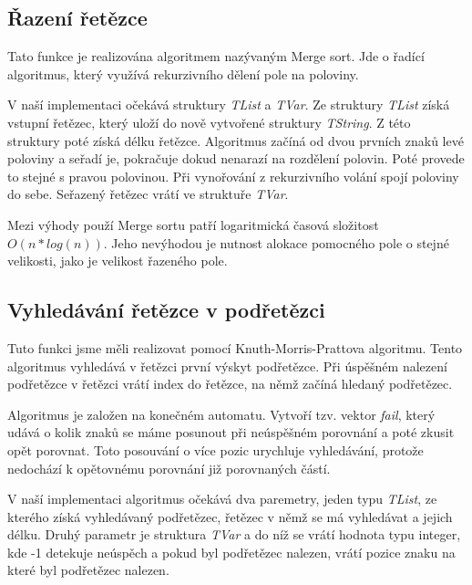 \documentclass[12pt,a4paper,titlepage,final]{article}
\begin{document}
\subsection{Řazení řetězce}

Tato funkce je realizována algoritmem nazývaným Merge sort. Jde o řadící algoritmus, který využívá rekurzivního 
dělení pole na poloviny. 

V naší implementaci očekává struktury \textit{TList} a \textit{TVar}. Ze struktury \textit{TList} získá vstupní řetězec, 
který uloží do nově vytvořené struktury \textit{TString}. Z této struktury poté získá délku řetězce. Algoritmus začíná od dvou 
prvních znaků levé poloviny a seřadí je, pokračuje dokud nenarazí na rozdělení polovin. 
Poté provede to stejné s pravou polovinou. Při vynořování z rekurzivního volání spojí poloviny do sebe.	
Seřazený řetězec vrátí ve struktuře \textit{TVar}.

Mezi výhody použí Merge sortu patří logaritmická časová složitost \begin{math}O(n*log(n))\end{math}. 
Jeho nevýhodou je nutnost alokace pomocného pole o stejné velikosti, jako je velikost řazeného pole. 

\subsection{Vyhledávání řetězce v podřetězci}

Tuto funkci jsme měli realizovat pomocí Knuth-Morris-Prattova algoritmu. Tento algoritmus vyhledává v řetězci 
první výskyt podřetězce. Při úspěšném nalezení podřetězce v řetězci vrátí index do řetězce, na němž začíná hledaný 
podřetězec. 

Algoritmus je založen na konečném automatu. Vytvoří tzv. vektor \textit{fail}, který udává o kolik znaků se máme posunout při neúspěšném porovnání a poté zkusit opět porovnat. Toto posouvání o více pozic urychluje vyhledávání, protože nedochází k opětovnému porovnání již porovnaných částí. 

V naší implementaci algoritmus očekává dva paremetry, jeden typu \textit{TList}, ze kterého získá vyhledávaný podřetězec, řetězec v němž se má vyhledávat a jejich délku. Druhý parametr je struktura \textit{TVar} a do níž 
se vrátí hodnota typu integer, kde -1 detekuje neúspěch a pokud byl podřetězec nalezen, vrátí pozice znaku na 
které byl podřetězec nalezen.
\end{document}
